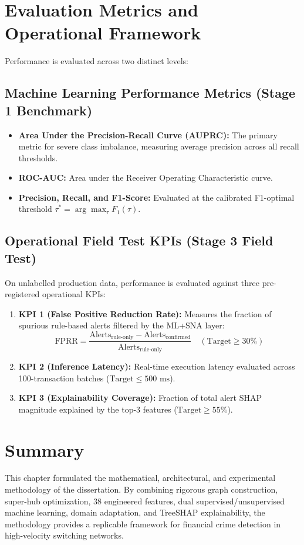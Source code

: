 \section{Evaluation Metrics and Operational Framework}
Performance is evaluated across two distinct levels:
\subsection{Machine Learning Performance Metrics (Stage 1 Benchmark)}
\begin{itemize}
    \item \textbf{Area Under the Precision-Recall Curve (AUPRC):} The primary metric for severe class imbalance, measuring average precision across all recall thresholds.
    \item \textbf{ROC-AUC:} Area under the Receiver Operating Characteristic curve.
    \item \textbf{Precision, Recall, and F1-Score:} Evaluated at the calibrated F1-optimal threshold $\tau^* = \arg\max_\tau F_1(\tau)$.
\end{itemize}

\subsection{Operational Field Test KPIs (Stage 3 Field Test)}
On unlabelled production data, performance is evaluated against three pre-registered operational KPIs:
\begin{enumerate}
    \item \textbf{KPI 1 (False Positive Reduction Rate):} Measures the fraction of spurious rule-based alerts filtered by the ML+SNA layer:
    \begin{equation}
        \text{FPRR} = \frac{\text{Alerts}_{\text{rule-only}} - \text{Alerts}_{\text{confirmed}}}{\text{Alerts}_{\text{rule-only}}} \quad (\text{Target} \ge 30\%)
    \end{equation}
    \item \textbf{KPI 2 (Inference Latency):} Real-time execution latency evaluated across 100-transaction batches ($\text{Target} \le 500\text{ ms}$).
    \item \textbf{KPI 3 (Explainability Coverage):} Fraction of total alert SHAP magnitude explained by the top-3 features ($\text{Target} \ge 55\%$).
\end{enumerate}

\section{Summary}
This chapter formulated the mathematical, architectural, and experimental methodology of the dissertation. By combining rigorous graph construction, super-hub optimization, 38 engineered features, dual supervised/unsupervised machine learning, domain adaptation, and TreeSHAP explainability, the methodology provides a replicable framework for financial crime detection in high-velocity switching networks.
